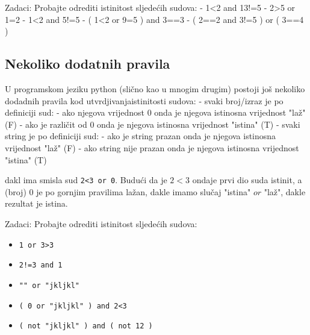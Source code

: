 Zadaci: Probajte odrediti istinitost sljede\'{c}ih sudova:
	- 1<2 and 13!=5
	- 2>5 or 1=2
	- 1<2 and 5!=5
	- ( 1<2 or 9=5 ) and 3==3
	- ( 2==2 and 3!=5 ) or ( 3==4 )

\subsection{Nekoliko dodatnih pravila}

U programskom jeziku python (sli\v{c}no kao u mnogim drugim) postoji
jo\v{s} nekoliko dodadnih pravila kod utvrdjivanjaistinitosti sudova:
- svaki broj/izraz je po definiciji sud:
	- ako njegova vrijednost 0 onda je njegova istinosna vrijednost "la\v{z}" (F)
	- ako je razli\v{c}it od 0 onda je njegova istinosna vrijednost "istina" (T)
- svaki string je po definiciji sud:
	- ako je string prazan onda je njegova istinosna vrijednost "la\v{z}" (F)
	- ako string nije prazan onda je njegova istinosna vrijednost "istina" (T)

dakl ima smisla sud \verb"2<3 or 0". Budu\'{c}i da je $2<3$ ondaje prvi dio suda istinit, a (broj) 0 je
po gornjim pravilima la\v{z}an, dakle imamo slu\v{c}aj "istina" $or$ "la\v{z}", dakle rezultat je istina.

Zadaci: Probajte odrediti istinitost sljede\'{c}ih sudova:
\begin{itemize}
\item \verb"1 or 3>3"
\item \verb"2!=3 and 1"
\item \verb+"" or "jkljkl"+
\item \verb+( 0 or "jkljkl" ) and 2<3+
\item \verb+( not "jkljkl" ) and ( not 12 )+
\end{itemize}
